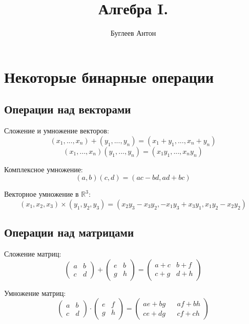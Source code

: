 \documentclass[a4paper, 14pt]{article}
\title{Алгебра I.}
\author{Буглеев Антон}
\date{}
\begin{document}
    \maketitle
    \newpage

    \section{Некоторые бинарные операции}
    \subsection{Операции над векторами}
    Сложение и умножение векторов: 
    \[(x_1, ..., x_n) + (y_1, ..., y_n) = (x_1 + y_1, ..., x_n + y_n)\]
    \[(x_1, ..., x_n)(y_1, ..., y_n) = (x_1y_1, ..., x_ny_n)\]

    Комплексное умножение:
    \[(a,b)(c,d) = (ac - bd, ad+bc)\]

    Векторное умножение в $\mathbb{R}^3$:    
    \[ (x_1,x_2,x_3) \times (y_1,y_2,y_3) = (x_2y_3 - x_3y_2, -x_1y_3 + x_3y_1, x_1y_2 - x_2y_2)\]
    

    \subsection{Операции над матрицами}
    Сложение матриц:
    \[
    \begin{pmatrix}
        a & b \\
        c & d
    \end{pmatrix}
    +
    \begin{pmatrix}
        e & b \\
        g & h
    \end{pmatrix}
    =
    \begin{pmatrix}
        a+c & b+f \\
        c+g & d + h
    \end{pmatrix}
    \]

    Умножение матриц:
    \[
        \begin{pmatrix}
            a & b \\
            c & d    
        \end{pmatrix}
        \cdot
        \begin{pmatrix}
            e & f \\
            g & h
        \end{pmatrix}
        =
        \begin{pmatrix}
            ae+bg && af+bh \\
            ce+dg && cf+ch
        \end{pmatrix}
    \]
    
\end{document}
